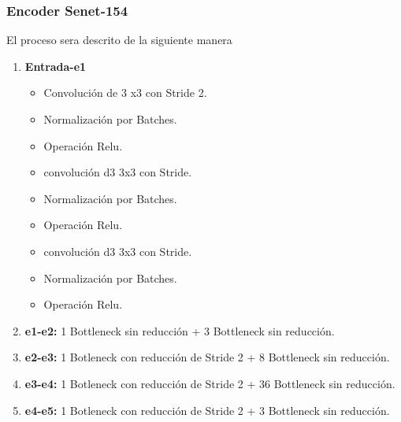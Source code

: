 \subsubsection{Encoder Senet-154}
El proceso sera descrito de la siguiente manera 
\begin{enumerate}
    \item \textbf{Entrada-e1}  
       \begin{itemize}
           \item Convolución de 3 x3  con \gls{Stride} 2.
           \item    Normalización por \gls{Batch}es.
            \item    Operación \gls{Relu}.
            \item    convolución d3 3x3 con \gls{Stride}.
           \item    Normalización por \gls{Batch}es.
            \item    Operación \gls{Relu}.
            \item    convolución d3 3x3 con \gls{Stride}.
           \item    Normalización por \gls{Batch}es.
            \item    Operación \gls{Relu}.
       \end{itemize}{}
    \item \textbf{e1-e2:} 1 Bottleneck sin reducción + 3 Bottleneck  sin reducción. 
     \item \textbf{e2-e3:} 1 Botleneck con reducción de Stride 2 + 8 Bottleneck sin reducción. 
     
    \item \textbf{e3-e4:} 1 Botleneck con reducción de Stride 2 + 36 Bottleneck sin reducción.
    \item \textbf{e4-e5:} 1 Botleneck con reducción de Stride 2 + 3 Bottleneck sin reducción.
\end{enumerate}{}
